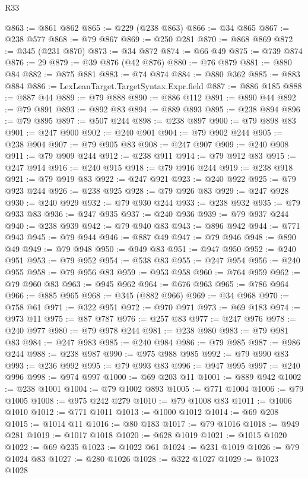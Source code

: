 \begin{lexlean}{R33}
\begin{coremodule}
@863 := @861 @862
@865 := @229 (@238 @863)
@866 := @34 @865
@867 := @238 @577
@868 := @79 @867
@869 := @250 @281
@870 := @868 @869
@872 := @345 (@231 @870)
@873 := @34 @872
@874 := @66 @49
@875 := @739 @874
@876 := 29
@879 := @39 @876 (@42 @876)
@880 := @76 @879
@881 := @880 @84
@882 := @875 @881
@883 := @74 @874
@884 := @880 @362
@885 := @883 @884
@886 := LexLeanTarget.TargetSyntax.Expr.field
@887 := @886 @185
@888 := @887 @44
@889 := @79 @888
@890 := @886 @112
@891 := @890 @44
@892 := @79 @891
@893 := @892 @83
@894 := @889 @893
@895 := @238 @894
@896 := @79 @895
@897 := @507 @244
@898 := @238 @897
@900 := @79 @898 @83
@901 := @247 @900
@902 := @240 @901
@904 := @79 @902 @244
@905 := @238 @904
@907 := @79 @905 @83
@908 := @247 @907
@909 := @240 @908
@911 := @79 @909 @244
@912 := @238 @911
@914 := @79 @912 @83
@915 := @247 @914
@916 := @240 @915
@918 := @79 @916 @244
@919 := @238 @918
@921 := @79 @919 @83
@922 := @247 @921
@923 := @240 @922
@925 := @79 @923 @244
@926 := @238 @925
@928 := @79 @926 @83
@929 := @247 @928
@930 := @240 @929
@932 := @79 @930 @244
@933 := @238 @932
@935 := @79 @933 @83
@936 := @247 @935
@937 := @240 @936
@939 := @79 @937 @244
@940 := @238 @939
@942 := @79 @940 @83
@943 := @896 @942
@944 := @771 @943
@945 := @79 @944
@946 := @887 @49
@947 := @79 @946
@948 := @890 @49
@949 := @79 @948
@950 := @949 @83
@951 := @947 @950
@952 := @240 @951
@953 := @79 @952
@954 := @538 @83
@955 := @247 @954
@956 := @240 @955
@958 := @79 @956 @83
@959 := @953 @958
@960 := @764 @959
@962 := @79 @960 @83
@963 := @945 @962
@964 := @676 @963
@965 := @786 @964
@966 := @885 @965
@968 := @345 (@882 @966)
@969 := @34 @968
@970 := @758 @61
@971 := @322 @951
@972 := @970 @971
@973 := @69 @183
@974 := @973 @11
@975 := @87 @787
@976 := @257 @83
@977 := @247 @976
@978 := @240 @977
@980 := @79 @978 @244
@981 := @238 @980
@983 := @79 @981 @83
@984 := @247 @983
@985 := @240 @984
@986 := @79 @985
@987 := @986 @244
@988 := @238 @987
@990 := @975 @988 @985
@992 := @79 @990 @83
@993 := @236 @992
@995 := @79 @993 @83
@996 := @947 @995
@997 := @240 @996
@998 := @974 @997
@1000 := @69 @203 @11
@1001 := @889 @942
@1002 := @238 @1001
@1004 := @79 @1002 @893
@1005 := @771 @1004
@1006 := @79 @1005
@1008 := @975 @242 @279
@1010 := @79 @1008 @83
@1011 := @1006 @1010
@1012 := @771 @1011
@1013 := @1000 @1012
@1014 := @69 @208
@1015 := @1014 @11
@1016 := @80 @183
@1017 := @79 @1016
@1018 := @949 @281
@1019 := @1017 @1018
@1020 := @628 @1019
@1021 := @1015 @1020
@1022 := @69 @235
@1023 := @1022 @61
@1024 := @231 @1019
@1026 := @79 @1024 @83
@1027 := @280 @1026
@1028 := @322 @1027
@1029 := @1023 @1028

\end{coremodule}
\end{lexlean}
